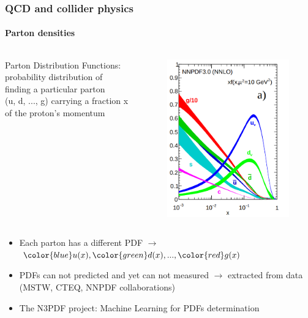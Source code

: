 \documentclass[aspectratio=43]{beamer}
\begin{document}
\begin{frame}
	
	\frametitle{QCD and collider physics}
	\framesubtitle{Parton densities}
	
	\footnotesize

	\begin{columns}
	

	{\color{blue} Parton Distribution Functions: probability distribution of finding a particular parton \\ (u, d, ..., g) carrying a fraction x of the proton's momentum}

	
	\begin{figure}
		\includegraphics[width = 3 cm]{plots/part1/chapter2/PDF.png}
	\end{figure}
	
	\end{columns}

	\begin{itemize}
		\item Each parton has a different PDF $\longrightarrow$ ${\color{blue}u(x)}, {\color{green}d(x)}, ..., {\color{red}g(x)}$
		\item PDFs can not predicted and yet can not measured $\longrightarrow$ extracted from data \\ (MSTW, CTEQ, NNPDF collaborations)
		\item The N3PDF project: Machine Learning for PDFs determination
	\end{itemize}

\end{frame}
\end{document}
